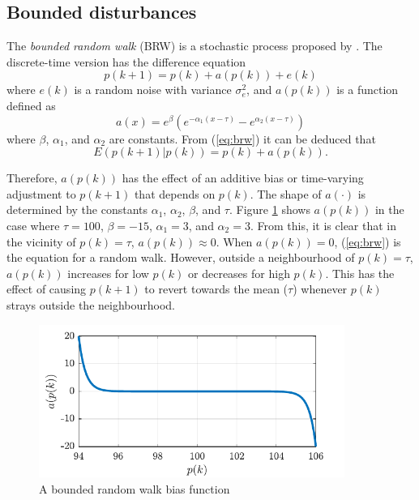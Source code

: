 \subsection{Bounded disturbances}

The \textit{bounded random walk} (BRW) is a stochastic process proposed by \cite{nicolau_stationary_2002}. The discrete-time version has the difference equation
\begin{equation} \label{eq:brw}
		p(k+1) = p(k) + a(p(k)) + e(k)
\end{equation}
where $e(k)$ is a random noise with variance $\sigma_e^2$, and $a(p(k))$ is a function defined as
\begin{equation}
	a(x) = e^{\beta}\left(e^{-\alpha_{1}\left(x - \tau\right)} - e^{\alpha_{2}\left(x - \tau\right)}\right)
\end{equation}
where $\beta$, $\alpha_{1}$, and $\alpha_{2}$ are constants.  From (\ref{eq:brw}) it can be deduced that
\begin{equation}
	E(p(k+1)|p(k)) = p(k) + a(p(k)).
\end{equation}

Therefore, $a(p(k))$ has the effect of an additive bias or time-varying adjustment to $p(k+1)$ that depends on $p(k)$. The shape of $a(\cdot)$ is determined by the constants $\alpha_{1}$,  $\alpha_{2}$, $\beta$, and $\tau$. Figure \ref{fig:brw-a} shows $a(p(k))$ in the case where $\tau=100$, $\beta=-15$, $\alpha_{1}=3$, and $\alpha_{2}=3$.  From this, it is clear that in the vicinity of $p(k)=\tau$, $a(p(k))\approx0$. When $a(p(k))=0$, (\ref{eq:brw}) is the equation for a random walk. However, outside a neighbourhood of $p(k)=\tau$, $a(p(k))$ increases for low $p(k)$ or decreases for high $p(k)$. This has the effect of causing $p(k+1)$ to revert towards the mean ($\tau$) whenever $p(k)$ strays outside the neighbourhood. 

\begin{figure}[htp]
	\centering
	\includegraphics[height=5cm]{images/brw_a.pdf}
	\caption{A bounded random walk bias function}
	\label{fig:brw-a}
\end{figure}

